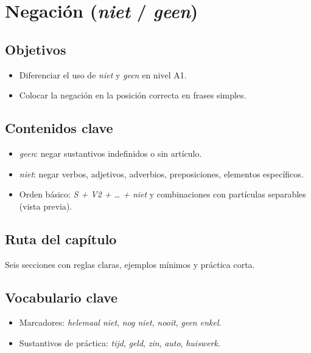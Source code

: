 \chapter{Negación (\textit{niet} / \textit{geen})}
\section{Objetivos}
\begin{itemize}[leftmargin=*]
	\item Diferenciar el uso de \textit{niet} y \textit{geen} en nivel A1.
	\item Colocar la negación en la posición correcta en frases simples.
\end{itemize}

\section{Contenidos clave}
\begin{itemize}[leftmargin=*]
	\item \textit{geen}: negar sustantivos indefinidos o sin artículo.
	\item \textit{niet}: negar verbos, adjetivos, adverbios, preposiciones, elementos específicos.
	\item Orden básico: \textit{S + V2 + \ldots{} + niet} y combinaciones con partículas separables (vista previa).
\end{itemize}

\section{Ruta del capítulo}
Seis secciones con reglas claras, ejemplos mínimos y práctica corta.








\section{Vocabulario clave}
\begin{itemize}[leftmargin=*]
	\item Marcadores: \textit{helemaal niet}, \textit{nog niet}, \textit{nooit}, \textit{geen enkel}.
	\item Sustantivos de práctica: \textit{tijd}, \textit{geld}, \textit{zin}, \textit{auto}, \textit{huiswerk}.
\end{itemize}

